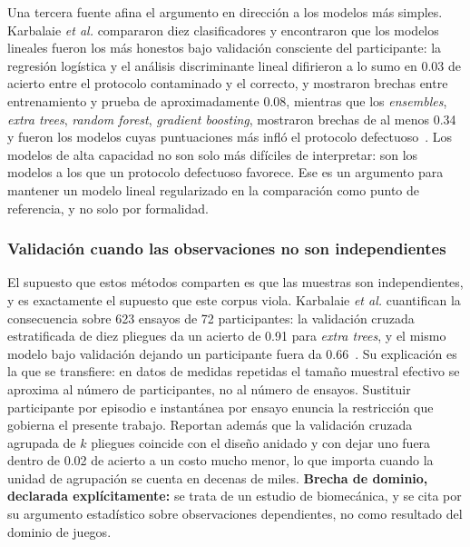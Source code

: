 \documentclass[conference]{IEEEtran}
\begin{document}
Una tercera fuente afina el argumento en direcci\'on a los modelos m\'as
simples. Karbalaie \textit{et al.} compararon diez clasificadores y
encontraron que los modelos lineales fueron los m\'as honestos bajo
validaci\'on consciente del participante: la regresi\'on log\'istica y el
an\'alisis discriminante lineal difirieron a lo sumo en 0.03 de acierto
entre el protocolo contaminado y el correcto, y mostraron brechas entre
entrenamiento y prueba de aproximadamente 0.08, mientras que los
\emph{ensembles}, \emph{extra trees}, \emph{random forest},
\emph{gradient boosting}, mostraron brechas de al menos 0.34 y fueron
los modelos cuyas puntuaciones m\'as infl\'o el protocolo
defectuoso~\cite{karbalaie_participantaware_2026}. Los modelos de alta
capacidad no son solo m\'as dif\'iciles de interpretar: son los modelos a
los que un protocolo defectuoso favorece. Ese es un argumento para mantener
un modelo lineal regularizado en la comparaci\'on como punto de referencia,
y no solo por formalidad.

\subsubsection{Validaci\'on cuando las observaciones no son independientes}
El supuesto que estos m\'etodos comparten es que las muestras son
independientes, y es exactamente el supuesto que este corpus viola.
Karbalaie \textit{et al.} cuantifican la consecuencia sobre 623 ensayos de
72 participantes: la validaci\'on cruzada estratificada de diez pliegues da
un acierto de 0.91 para \emph{extra trees}, y el mismo modelo bajo
validaci\'on dejando un participante fuera da
0.66~\cite{karbalaie_participantaware_2026}. Su explicaci\'on es la que se
transfiere: en datos de medidas repetidas el tama\~no muestral efectivo se
aproxima al n\'umero de participantes, no al n\'umero de ensayos.
Sustituir participante por episodio e instant\'anea por ensayo enuncia la
restricci\'on que gobierna el presente trabajo. Reportan adem\'as que la
validaci\'on cruzada agrupada de $k$ pliegues coincide con el dise\~no
anidado y con dejar uno fuera dentro de 0.02 de acierto a un costo mucho
menor, lo que importa cuando la unidad de agrupaci\'on se cuenta en decenas
de miles. \textbf{Brecha de dominio, declarada expl\'icitamente:} se trata
de un estudio de biomec\'anica, y se cita por su argumento estad\'istico
sobre observaciones dependientes, no como resultado del dominio de juegos.
\end{document}
